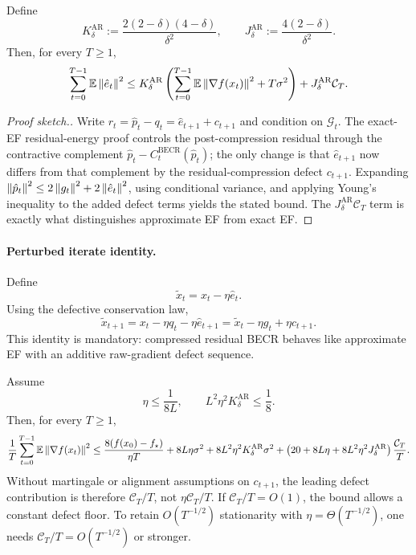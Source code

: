 \begin{proposition}
\label{prop:approx-becr-residual-energy}
Define
\[
K_{\delta}^{\mathrm{AR}} := \frac{2(2-\delta)(4-\delta)}{\delta^2},
\qquad
J_{\delta}^{\mathrm{AR}} := \frac{4(2-\delta)}{\delta^2}.
\]
Then, for every $T\ge 1$,
\[
\sum_{t=0}^{T-1}\mathbb{E}\left\lVert \hat e_t \right\rVert^2
\le
K_{\delta}^{\mathrm{AR}}
\left(
\sum_{t=0}^{T-1}\mathbb{E}\left\lVert \nabla f(x_t) \right\rVert^2
+
T\sigma^2
\right)
+
J_{\delta}^{\mathrm{AR}}\mathcal C_T.
\]
\end{proposition}

\begin{proof}[Proof sketch.]
Write $r_t=\hat p_t-q_t=\hat e_{t+1}+c_{t+1}$ and condition on
$\mathcal G_t$. The exact-EF residual-energy proof controls the
post-compression residual through the contractive complement
$\hat p_t-C_t^{\mathrm{BECR}}(\hat p_t)$; the only change is that
$\hat e_{t+1}$ now differs from that complement by the residual-compression
defect $c_{t+1}$. Expanding
$\left\lVert \hat p_t \right\rVert^2\le 2\left\lVert g_t \right\rVert^2 + 2\left\lVert \hat e_t \right\rVert^2$, using conditional
variance, and applying Young's inequality to the added defect terms yields the
stated bound. The $J_{\delta}^{\mathrm{AR}}\mathcal C_T$ term is exactly what
distinguishes approximate EF from exact EF.
\end{proof}

\paragraph{Perturbed iterate identity.}
Define
\[
\tilde x_t = x_t - \eta \hat e_t.
\]
Using the defective conservation law,
\[
\tilde x_{t+1}
=
x_t-\eta q_t-\eta \hat e_{t+1}
=
\tilde x_t-\eta g_t+\eta c_{t+1}.
\]
This identity is mandatory: compressed residual BECR behaves like approximate
EF with an additive raw-gradient defect sequence.

\begin{theorem}
\label{thm:compressed-becr-general-defect}
Assume
\[
\eta\le \frac{1}{8L},
\qquad
L^2\eta^2 K_{\delta}^{\mathrm{AR}}\le \frac{1}{8}.
\]
Then, for every $T\ge 1$,
\[
\frac{1}{T}\sum_{t=0}^{T-1}\mathbb{E}\left\lVert \nabla f(x_t) \right\rVert^2
\le
\frac{8(f(x_0)-f_\star)}{\eta T}
+
8L\eta\sigma^2
+
8L^2\eta^2 K_{\delta}^{\mathrm{AR}}\sigma^2
+
\left(20 + 8L\eta + 8L^2\eta^2J_{\delta}^{\mathrm{AR}}\right)\frac{\mathcal C_T}{T}.
\]
Without martingale or alignment assumptions on $c_{t+1}$, the leading defect
contribution is therefore $\mathcal C_T/T$, not $\eta\mathcal C_T/T$. If
$\mathcal C_T/T=O(1)$, the bound allows a constant defect floor. To retain
$O(T^{-1/2})$ stationarity with $\eta=\Theta(T^{-1/2})$, one needs
$\mathcal C_T/T = O(T^{-1/2})$ or stronger.
\end{theorem}

